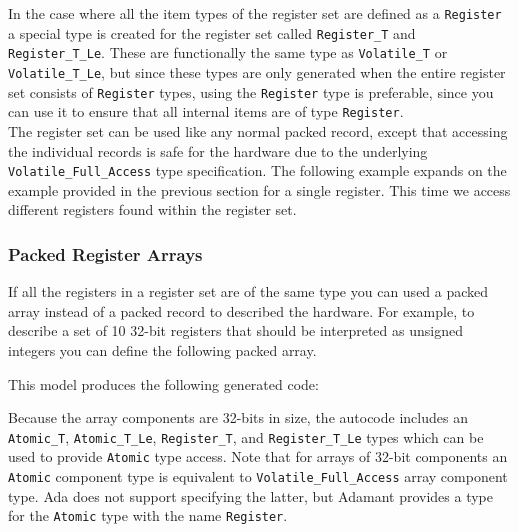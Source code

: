 In the case where all the item types of the register set are defined as a \texttt{Register} a special type is created for the register set called \texttt{Register\_T} and \texttt{Register\_T\_Le}. These are functionally the same type as \texttt{Volatile\_T} or \texttt{Volatile\_T\_Le}, but since these types are only generated when the entire register set consists of \texttt{Register} types, using the \texttt{Register} type is preferable, since you can use it to ensure that all internal items are of type \texttt{Register}. \\

The register set can be used like any normal packed record, except that accessing the individual records is safe for the hardware due to the underlying \texttt{Volatile\_Full\_Access} type specification. The following example expands on the example provided in the previous section for a single register. This time we access different registers found within the register set.


\subsubsection{Packed Register Arrays}

If all the registers in a register set are of the same type you can used a packed array instead of a packed record to described the hardware. For example, to describe a set of 10 32-bit registers that should be interpreted as unsigned integers you can define the following packed array.


This model produces the following generated code:


Because the array components are 32-bits in size, the autocode includes an \texttt{Atomic\_T}, \texttt{Atomic\_T\_Le}, \texttt{Register\_T}, and \texttt{Register\_T\_Le} types which can be used to provide \texttt{Atomic} type access. Note that for arrays of 32-bit components an \texttt{Atomic} component type is equivalent to \texttt{Volatile\_Full\_Access} array component type. Ada does not support specifying the latter, but Adamant provides a type for the \texttt{Atomic} type with the name \texttt{Register}. \\

